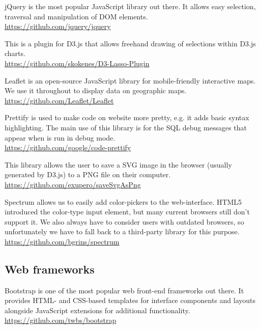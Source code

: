 \begin{description}[align=left,style=nextline,leftmargin=*,labelsep=\parindent,font=\bfseries]
	\item[jQuery] jQuery is the most popular JavaScript library out there. It allows easy selection, traversal and manipulation of DOM elements. \\\url{https://github.com/jquery/jquery}
	\item[lasso.js]  This is a plugin for D3.js that allows freehand drawing of selections within D3.js charts.\\\url{https://github.com/skokenes/D3-Lasso-Plugin}
	\item[Leaflet] Leaflet is an open-source JavaScript library for mobile-friendly interactive maps. We use it throughout {\germinate} to display data on geographic maps. \\\url{https://github.com/Leaflet/Leaflet}
	\item[prettify.js] Prettify is used to make code on website more pretty, e.g. it adds basic syntax highlighting. The main use of this library is for the SQL debug messages that appear when {\germinate} is run in debug mode.\\\url{https://github.com/google/code-prettify}
	\item[saveSvgAsPng.js] This library allows the user to save a SVG image in the browser (usually generated by D3.js) to a PNG file on their computer.\\\url{https://github.com/exupero/saveSvgAsPng}
	\item[Spectrum] Spectrum allows us to easily add color-pickers to the web-interface. HTML5 introduced the color-type input element, but many current browsers still don't support it. We also always have to consider users with outdated browsers, so unfortunately we have to fall back to a third-party library for this purpose.\\\url{https://github.com/bgrins/spectrum}
\end{description}

\subsection{Web frameworks}
\begin{description}[align=left,style=nextline,leftmargin=*,labelsep=\parindent,font=\bfseries]
	\item[Bootstrap] Bootstrap is one of the most popular web front-end frameworks out there. It provides HTML- and CSS-based templates for interface components and layouts alongside JavaScript extensions for additional functionality.\\\url{https://github.com/twbs/bootstrap}
\end{description}

